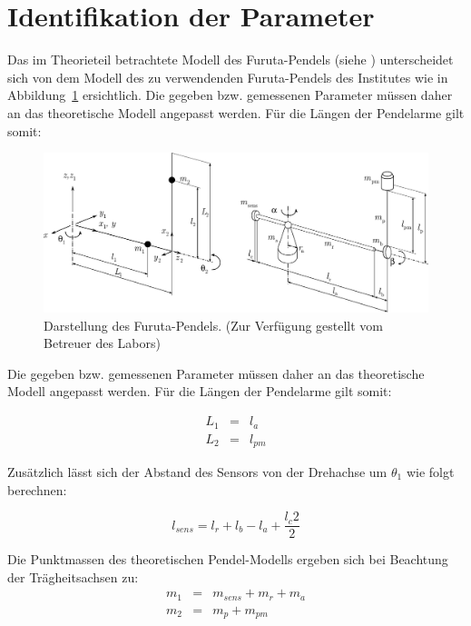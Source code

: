 \section{Identifikation der Parameter}
\label{sec.Parameter}

Das im Theorieteil betrachtete Modell des Furuta-Pendels (siehe \cite{Cazzolato.2011}) unterscheidet sich von dem Modell des zu verwendenden Furuta-Pendels des Institutes wie in Abbildung~\ref{fig.FurutaPlant} ersichtlich.
Die gegeben bzw. gemessenen Parameter müssen daher an das theoretische Modell angepasst werden. Für die Längen der Pendelarme gilt somit:

\begin{figure}[htbp]
	\centering
	\includegraphics[width=1.\textwidth]{Grafiken/adelaideimagenew}
	\caption{Darstellung des Furuta-Pendels. (Zur Verfügung gestellt vom Betreuer des Labors) }
	\label{fig.FurutaPlant}
\end{figure}

Die gegeben bzw. gemessenen Parameter müssen daher an das theoretische Modell angepasst werden. Für die Längen der Pendelarme gilt somit:

\begin{eqnarray}
L_1 &=& l_a \nonumber \\
L_2 &=& l_{pm} \nonumber 
\end{eqnarray}

Zusätzlich lässt sich der Abstand des Sensors von der Drehachse um $\theta_1$  wie folgt berechnen:

\begin{equation}
l_{sens} = l_r+l_b-l_a+\dfrac{l_c2}{2}
\end{equation}

Die Punktmassen des theoretischen Pendel-Modells ergeben sich bei Beachtung der Trägheitsachsen zu:
\begin{eqnarray}
m_1 &=& m_{sens}+m_r+m_a \nonumber \\
m_2 &=& m_p+m_{pm}
\end{eqnarray}

